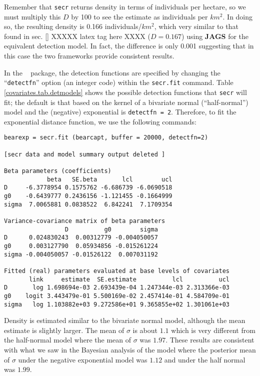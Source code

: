 Remember that \mbox{\tt secr} returns density in terms of
individuals per
hectare, so we must multiply this $D$ by 100 to see the estimate as
individuals per $km^2$.  In doing so, the resulting density is 0.166
individuals/$km^2$, which very similar to that found in sec. \ref{} XXXXX
latex tag here XXXX ($D = 0.167$)
using {\bf JAGS} for the equivalent detection model. In fact, the difference
is only 0.001 suggesting that in this case the two frameworks provide consistent
results.

In the \secr~ package, the detection functions are specified
by changing the ``\mbox{\tt detectfn}'' option (an integer code)
within the \mbox{\tt secr.fit} command.  Table
\ref{covariates.tab.detmodels} shows the possible detection functions
that \mbox{\tt secr} will fit; the default is that based on the kernel
of a bivariate normal
(``half-normal'') model and the
(negative) exponential is \mbox{\tt detectfn = 2}. Therefore, to fit the
exponential distance function, we use the following commands:

{\small
\begin{verbatim}
bearexp = secr.fit (bearcapt, buffer = 20000, detectfn=2)

[secr data and model summary output deleted ]

Beta parameters (coefficients)
            beta   SE.beta       lcl        ucl
D     -6.3778954 0.1575762 -6.686739 -6.0690518
g0    -0.6439777 0.2436156 -1.121455 -0.1664999
sigma  7.0065881 0.0838522  6.842241  7.1709354

Variance-covariance matrix of beta parameters
                 D          g0        sigma
D      0.024830243  0.00312779 -0.004050057
g0     0.003127790  0.05934856 -0.015261224
sigma -0.004050057 -0.01526122  0.007031192

Fitted (real) parameters evaluated at base levels of covariates
       link     estimate  SE.estimate          lcl          ucl
D       log 1.698694e-03 2.693439e-04 1.247344e-03 2.313366e-03
g0    logit 3.443479e-01 5.500169e-02 2.457414e-01 4.584709e-01
sigma   log 1.103882e+03 9.272586e+01 9.365855e+02 1.301061e+03
\end{verbatim}
}

Density is estimated similar to the bivariate normal model,
although the mean
estimate is slightly larger. The
mean of
$\sigma$ is about $1.1$
 which is very different from the half-normal model where the
 mean of $\sigma$ was $1.97$.
These results are consistent with what we saw in the Bayesian
analysis of the model where the posterior mean of $\sigma$ under the negative
exponential model was $1.12$ and under the half normal was $1.99$.


